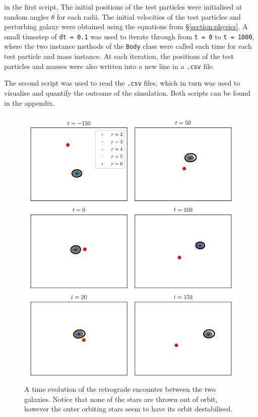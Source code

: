 \documentclass[twoside,twocolumn]{article}
\begin{document}
        in the first script, The initial positions of the test particles were initialised at random angles $\theta$ for each radii. The initial velocities of the test particles and perturbing galaxy were obtained using the equations from \S \ref{section:physics}. A small timestep  of \texttt{dt = 0.1} was used to iterate through from \texttt{t = 0} to \texttt{t = 1000}, where the two instance methods of the \texttt{Body} class were called each time for each test particle and mass instance. At each iteration, the positions of the test particles and masses were also written into a new line in a \texttt{.csv} file.
        
        The second script was used to read the \texttt{.csv} files, which in turn was used to visualise and quantify the outcome of the simulation. Both scripts can be found in the appendix. 


\begin{figure}
    \centering
    \includegraphics[width=\linewidth]{images/clockwise_positions.png}
    \caption{A time evolution of the retrograde encounter between the two galaxies. Notice that none of the stars are thrown out of orbit, however the outer orbiting stars seem to have its orbit destabilised.}
    \label{figure:retrograde}
\end{figure}
\end{document}

